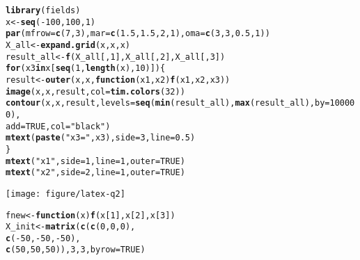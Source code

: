 \documentclass{article}\usepackage[]{graphicx}\usepackage[]{color}
\makeatletter
\def\maxwidth{ %
  \ifdim\Gin@nat@width>\linewidth
    \linewidth
  \else
    \Gin@nat@width
  \fi
}
\newcommand{\hlnum}[1]{\textcolor[rgb]{0.686,0.059,0.569}{#1}}%
\newcommand{\hlstr}[1]{\textcolor[rgb]{0.192,0.494,0.8}{#1}}%
\newcommand{\hlopt}[1]{\textcolor[rgb]{0,0,0}{#1}}%
\newcommand{\hlstd}[1]{\textcolor[rgb]{0.345,0.345,0.345}{#1}}%
\newcommand{\hlkwa}[1]{\textcolor[rgb]{0.161,0.373,0.58}{\textbf{#1}}}%
\newcommand{\hlkwb}[1]{\textcolor[rgb]{0.69,0.353,0.396}{#1}}%
\newcommand{\hlkwc}[1]{\textcolor[rgb]{0.333,0.667,0.333}{#1}}%
\newcommand{\hlkwd}[1]{\textcolor[rgb]{0.737,0.353,0.396}{\textbf{#1}}}%
\newenvironment{kframe}{%
 \def\at@end@of@kframe{}%
 \ifinner\ifhmode%
  \def\at@end@of@kframe{\end{minipage}}%
  \begin{minipage}{\columnwidth}%
 \fi\fi%
 \def\FrameCommand##1{\hskip\@totalleftmargin \hskip-\fboxsep
 \colorbox{shadecolor}{##1}\hskip-\fboxsep
     \hskip-\linewidth \hskip-\@totalleftmargin \hskip\columnwidth}%
 \MakeFramed {\advance\hsize-\width
   \@totalleftmargin\z@ \linewidth\hsize
   \@setminipage}}%
 {\par\unskip\endMakeFramed%
 \at@end@of@kframe}
\newenvironment{knitrout}{}{} %
\makeatother
\begin{document}
\begin{knitrout}
\begin{kframe}
\begin{alltt}
\hlkwd{library}\hlstd{(fields)}
\hlstd{x} \hlkwb{<-} \hlkwd{seq}\hlstd{(}\hlopt{-}\hlnum{100}\hlstd{,} \hlnum{100}\hlstd{,} \hlnum{1}\hlstd{)}
\hlkwd{par}\hlstd{(}\hlkwc{mfrow} \hlstd{=} \hlkwd{c}\hlstd{(}\hlnum{7}\hlstd{,} \hlnum{3}\hlstd{),} \hlkwc{mar} \hlstd{=} \hlkwd{c}\hlstd{(}\hlnum{1.5}\hlstd{,} \hlnum{1.5}\hlstd{,} \hlnum{2}\hlstd{,} \hlnum{1}\hlstd{),} \hlkwc{oma} \hlstd{=} \hlkwd{c}\hlstd{(}\hlnum{3}\hlstd{,} \hlnum{3}\hlstd{,} \hlnum{0.5}\hlstd{,} \hlnum{1}\hlstd{))}
\hlstd{X_all} \hlkwb{<-} \hlkwd{expand.grid}\hlstd{(x, x, x)}
\hlstd{result_all} \hlkwb{<-} \hlkwd{f}\hlstd{(X_all[,} \hlnum{1}\hlstd{], X_all[,} \hlnum{2}\hlstd{], X_all[,} \hlnum{3}\hlstd{])}
\hlkwa{for} \hlstd{(x3} \hlkwa{in} \hlstd{x[}\hlkwd{seq}\hlstd{(}\hlnum{1}\hlstd{,} \hlkwd{length}\hlstd{(x),} \hlnum{10}\hlstd{)]) \{}
  \hlstd{result} \hlkwb{<-} \hlkwd{outer}\hlstd{(x, x,} \hlkwa{function}\hlstd{(}\hlkwc{x1}\hlstd{,} \hlkwc{x2}\hlstd{)} \hlkwd{f}\hlstd{(x1, x2, x3))}
  \hlkwd{image}\hlstd{(x, x, result,} \hlkwc{col} \hlstd{=} \hlkwd{tim.colors}\hlstd{(}\hlnum{32}\hlstd{))}
  \hlkwd{contour}\hlstd{(x, x, result,} \hlkwc{levels} \hlstd{=} \hlkwd{seq}\hlstd{(}\hlkwd{min}\hlstd{(result_all),} \hlkwd{max}\hlstd{(result_all),} \hlkwc{by} \hlstd{=} \hlnum{100000}\hlstd{),}
          \hlkwc{add} \hlstd{=} \hlnum{TRUE}\hlstd{,} \hlkwc{col} \hlstd{=} \hlstr{"black"}\hlstd{)}
  \hlkwd{mtext}\hlstd{(}\hlkwd{paste}\hlstd{(}\hlstr{"x3 ="}\hlstd{, x3),} \hlkwc{side} \hlstd{=} \hlnum{3}\hlstd{,} \hlkwc{line} \hlstd{=} \hlnum{0.5}\hlstd{)}
\hlstd{\}}
\hlkwd{mtext}\hlstd{(}\hlstr{"x1"}\hlstd{,} \hlkwc{side} \hlstd{=} \hlnum{1}\hlstd{,} \hlkwc{line} \hlstd{=} \hlnum{1}\hlstd{,} \hlkwc{outer} \hlstd{=} \hlnum{TRUE}\hlstd{)}
\hlkwd{mtext}\hlstd{(}\hlstr{"x2"}\hlstd{,} \hlkwc{side} \hlstd{=} \hlnum{2}\hlstd{,} \hlkwc{line} \hlstd{=} \hlnum{1}\hlstd{,} \hlkwc{outer} \hlstd{=} \hlnum{TRUE}\hlstd{)}
\end{alltt}
\end{kframe}
\texttt{[image: figure/latex-q2]} 
\begin{kframe}\begin{alltt}
\hlstd{fnew} \hlkwb{<-} \hlkwa{function}\hlstd{(}\hlkwc{x}\hlstd{)} \hlkwd{f}\hlstd{(x[}\hlnum{1}\hlstd{], x[}\hlnum{2}\hlstd{], x[}\hlnum{3}\hlstd{])}
\hlstd{X_init} \hlkwb{<-} \hlkwd{matrix}\hlstd{(}\hlkwd{c}\hlstd{(}\hlkwd{c}\hlstd{(}\hlnum{0}\hlstd{,} \hlnum{0}\hlstd{,} \hlnum{0}\hlstd{),}
                   \hlkwd{c}\hlstd{(}\hlopt{-}\hlnum{50}\hlstd{,} \hlopt{-}\hlnum{50}\hlstd{,} \hlopt{-}\hlnum{50}\hlstd{),}
                   \hlkwd{c}\hlstd{(}\hlnum{50}\hlstd{,} \hlnum{50}\hlstd{,} \hlnum{50}\hlstd{)),} \hlnum{3}\hlstd{,} \hlnum{3}\hlstd{,} \hlkwc{byrow} \hlstd{=} \hlnum{TRUE}\hlstd{)}

\end{alltt}
\end{kframe}
\end{knitrout}
\end{document}
